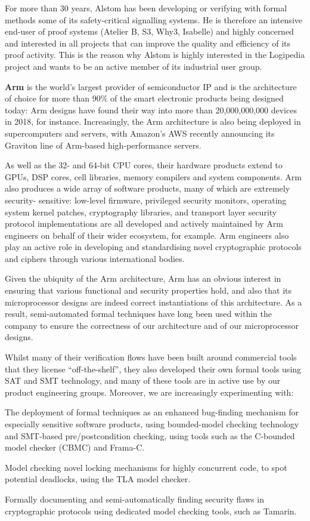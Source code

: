 For more than 30 years, Alstom has been developing or verifying with
formal methods some of its safety-critical signalling systems. He is
therefore an intensive end-user of proof systems (Atelier B, S3, Why3,
Isabelle) and highly concerned and interested in all projects that can
improve the quality and efficiency of its proof activity. This is the
reason why Alstom is highly interested in the Logipedia project and
wants to be an active member of its industrial user group.

{\bf Arm} is the world's largest provider of semiconductor IP and
is the architecture of choice for more than 90\% of the smart
electronic products being designed today: Arm designs have found their
way into more than 20,000,000,000 devices in 2018, for instance.
Increasingly, the Arm architecture is also being deployed in
supercomputers and servers, with Amazon’s AWS recently announcing its
Graviton line of Arm-based high-performance servers.

As well as the 32- and 64-bit CPU cores, their hardware products
extend to GPUs, DSP cores, cell libraries, memory compilers and system
components. Arm also produces a wide array of software products, many
of which are extremely security- sensitive: low-level firmware,
privileged security monitors, operating system kernel patches,
cryptography libraries, and transport layer security protocol
implementations are all developed and actively maintained by Arm
engineers on behalf of their wider ecosystem, for example. Arm
engineers also play an active role in developing and standardising
novel cryptographic protocols and ciphers through various
international bodies.

Given the ubiquity of the Arm architecture, Arm has an
obvious interest in ensuring that various functional and security
properties hold, and also that its microprocessor designs are indeed
correct instantiations of this architecture. As a result,
semi-automated formal techniques have long been used within the
company to ensure the correctness of our architecture and of our
microprocessor designs.

Whilst many of their verification flows have been built around
commercial tools that they license ``off-the-shelf'', they also
developed their own formal tools using SAT and SMT technology, and
many of these tools are in active use by our product engineering
groups. Moreover, we are increasingly experimenting with:

\begin{compactitem}
\item The deployment of formal techniques as an enhanced bug-finding
  mechanism for especially sensitive software products, using
  bounded-model checking technology and SMT-based pre/postcondition
  checking, using tools such as the C-bounded model checker (CBMC) and
  Frama-C.
\item Model checking novel locking mechanisms for highly concurrent
  code, to spot potential deadlocks, using the TLA model checker.
\item Formally documenting and semi-automatically finding security
  flaws in cryptographic protocols using dedicated model checking
  tools, such as Tamarin.
\end{compactitem}

